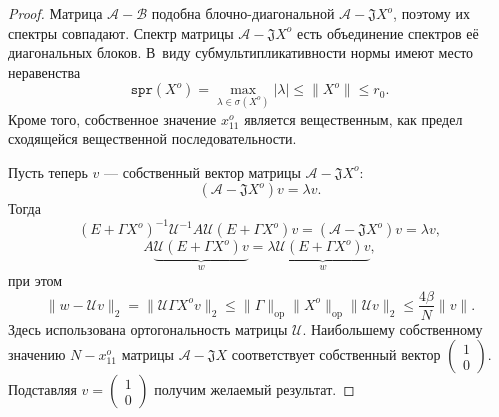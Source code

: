 \begin{proof}
    Матрица \( \mathcal{A} - \mathcal{B} \) подобна блочно-диагональной \( \mathcal{A} - \mathfrak{J} X^o \),
    поэтому их спектры совпадают.
    Спектр матрицы \( \mathcal{A} - \mathfrak{J} X^o \) есть объединение спектров е\"е диагональных блоков.
    В~виду субмультипликативности нормы имеют место неравенства
    \[ \mathtt{spr}(X^o) = \max_{\lambda\in\sigma(X^o)}\lvert\lambda\rvert \leq \|X^o\| \leq r_0. \]
    Кроме того, собственное значение \( x_{11}^o \) является вещественным, как предел сходящейся вещественной последовательности.

    Пусть теперь \( v \) --- собственный вектор матрицы \( \mathcal{A}-\mathfrak{J}X^o \):
    \[
        (\mathcal{A} - \mathfrak{J}X^o) v = \lambda v.
        \]
    Тогда
    \[
        (E+\Gamma X^o)^{-1}\mathcal{U}^{-1} A \mathcal{U} (E+\Gamma X^o) v = (\mathcal{A} - \mathfrak{J}X^o)v = \lambda v,
        \]
    \[
        A \underbrace{\mathcal{U} (E+\Gamma X^o) v}_{w} = \lambda \underbrace{\mathcal{U} (E+\Gamma X^o) v}_{w},
        \]
    при этом
    \[
        \|w - \mathcal{U}v\|_2 = \|\mathcal{U}\Gamma X^o v\|_2 \leq
        \|\Gamma\|_{\mathrm{op}} \|X^o\|_{\mathrm{op}} \|\mathcal{U} v\|_2 \leq
        \frac{4\beta}{N} \|v\|.
        \]
    Здесь использована ортогональность матрицы \( \mathcal{U} \).
    Наибольшему собственному значению \( N - x_{11}^o \)
        матрицы \( \mathcal{A} - \mathfrak{J}X \) соответствует
        собственный вектор \( \begin{pmatrix}1\\ 0\end{pmatrix} \).
    Подставляя \( v = \begin{pmatrix}1\\ 0\end{pmatrix} \)
            получим желаемый результат.
\end{proof}
